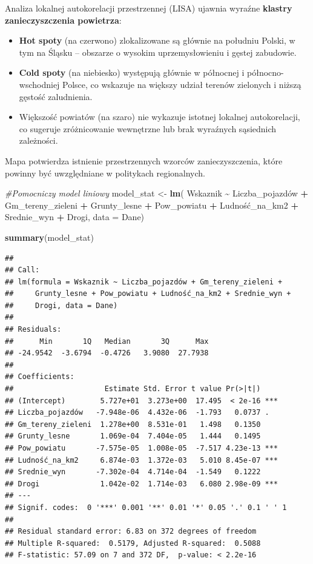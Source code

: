 \documentclass[
  11pt,
]{article}
\newenvironment{Shaded}{\begin{snugshade}}{\end{snugshade}}
\newcommand{\AttributeTok}[1]{\textcolor[rgb]{0.13,0.29,0.53}{#1}}
\newcommand{\CommentTok}[1]{\textcolor[rgb]{0.56,0.35,0.01}{\textit{#1}}}
\newcommand{\FunctionTok}[1]{\textcolor[rgb]{0.13,0.29,0.53}{\textbf{#1}}}
\newcommand{\NormalTok}[1]{#1}
\newcommand{\OtherTok}[1]{\textcolor[rgb]{0.56,0.35,0.01}{#1}}
\newcommand{\SpecialCharTok}[1]{\textcolor[rgb]{0.81,0.36,0.00}{\textbf{#1}}}
\begin{document}
Analiza lokalnej autokorelacji przestrzennej (LISA) ujawnia wyraźne
\textbf{klastry zanieczyszczenia powietrza}:

\begin{itemize}
\item
  \textbf{Hot spoty} (na czerwono) zlokalizowane są głównie na południu
  Polski, w tym na Śląsku -- obszarze o wysokim uprzemysłowieniu i
  gęstej zabudowie.
\item
  \textbf{Cold spoty} (na niebiesko) występują głównie w północnej i
  północno-wschodniej Polsce, co wskazuje na większy udział terenów
  zielonych i niższą gęstość zaludnienia.
\item
  Większość powiatów (na szaro) nie wykazuje istotnej lokalnej
  autokorelacji, co sugeruje zróżnicowanie wewnętrzne lub brak wyraźnych
  sąsiednich zależności.
\end{itemize}

Mapa potwierdza istnienie przestrzennych wzorców zanieczyszczenia, które
powinny być uwzględniane w politykach regionalnych.

\begin{Shaded}
\begin{Highlighting}[]
\CommentTok{\#Pomocniczy model liniowy}
\NormalTok{model\_stat }\OtherTok{\textless{}{-}} \FunctionTok{lm}\NormalTok{(}
\NormalTok{  Wskaznik }\SpecialCharTok{\textasciitilde{}}\NormalTok{ Liczba\_pojazdów }\SpecialCharTok{+}
\NormalTok{    Gm\_tereny\_zieleni }\SpecialCharTok{+}
\NormalTok{    Grunty\_lesne }\SpecialCharTok{+}
\NormalTok{    Pow\_powiatu }\SpecialCharTok{+}
\NormalTok{    Ludność\_na\_km2 }\SpecialCharTok{+}
\NormalTok{    Srednie\_wyn }\SpecialCharTok{+}
\NormalTok{    Drogi,}
  \AttributeTok{data =}\NormalTok{ Dane)}

\FunctionTok{summary}\NormalTok{(model\_stat)}
\end{Highlighting}
\end{Shaded}

\begin{verbatim}
## 
## Call:
## lm(formula = Wskaznik ~ Liczba_pojazdów + Gm_tereny_zieleni + 
##     Grunty_lesne + Pow_powiatu + Ludność_na_km2 + Srednie_wyn + 
##     Drogi, data = Dane)
## 
## Residuals:
##      Min       1Q   Median       3Q      Max 
## -24.9542  -3.6794  -0.4726   3.9080  27.7938 
## 
## Coefficients:
##                     Estimate Std. Error t value Pr(>|t|)    
## (Intercept)        5.727e+01  3.273e+00  17.495  < 2e-16 ***
## Liczba_pojazdów   -7.948e-06  4.432e-06  -1.793   0.0737 .  
## Gm_tereny_zieleni  1.278e+00  8.531e-01   1.498   0.1350    
## Grunty_lesne       1.069e-04  7.404e-05   1.444   0.1495    
## Pow_powiatu       -7.575e-05  1.008e-05  -7.517 4.23e-13 ***
## Ludność_na_km2     6.874e-03  1.372e-03   5.010 8.45e-07 ***
## Srednie_wyn       -7.302e-04  4.714e-04  -1.549   0.1222    
## Drogi              1.042e-02  1.714e-03   6.080 2.98e-09 ***
## ---
## Signif. codes:  0 '***' 0.001 '**' 0.01 '*' 0.05 '.' 0.1 ' ' 1
## 
## Residual standard error: 6.83 on 372 degrees of freedom
## Multiple R-squared:  0.5179, Adjusted R-squared:  0.5088 
## F-statistic: 57.09 on 7 and 372 DF,  p-value: < 2.2e-16
\end{verbatim}
\end{document}
